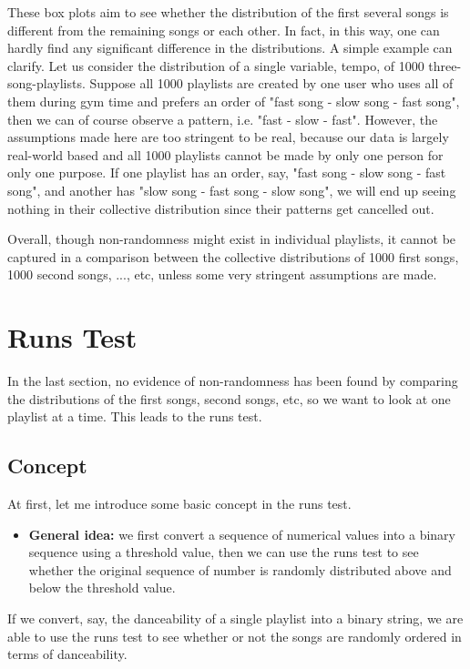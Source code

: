 \documentclass[12pt]{article}
\theoremstyle{plain}
\theoremstyle{definition}
\theoremstyle{remark}
\begin{document}
These box plots aim to see whether the distribution of the first several songs is different from the remaining songs or each other. In fact, in this way, one can hardly find any significant difference in the distributions. A simple example can clarify. Let us consider the distribution of a single variable, tempo, of 1000 three-song-playlists. Suppose all 1000 playlists are created by one user who uses all of them during gym time and prefers an order of "fast song - slow song - fast song", then we can of course observe a pattern, i.e. "fast - slow - fast". However, the assumptions made here are too stringent to be real, because our data is largely real-world based and all 1000 playlists cannot be made by only one person for only one purpose. If one playlist has an order, say, "fast song - slow song - fast song", and another has "slow song - fast song - slow song", we will end up seeing nothing in their collective distribution since their patterns get cancelled out. 

Overall, though non-randomness might exist in individual playlists, it cannot be captured in a comparison between the collective distributions of 1000 first songs, 1000 second songs, ..., etc, unless some very stringent assumptions are made. 

\newpage


\section{Runs Test}
In the last section, no evidence of non-randomness has been found by comparing the distributions of the first songs, second songs, etc, so we want to look at one playlist at a time. This leads to the runs test\cite{3.5}.

\subsection{Concept}
 At first, let me introduce some basic concept in the runs test.

\begin{itemize}
    \item \textbf{General idea:} we first convert a sequence of numerical values into a binary sequence using a threshold value, then we can use the runs test to see whether the original sequence of number is randomly distributed above and below the threshold value.
\end{itemize}

If we convert, say, the danceability of a single playlist into a binary string, we are able to use the runs test to see whether or not the songs are randomly ordered in terms of danceability.
\end{document}
